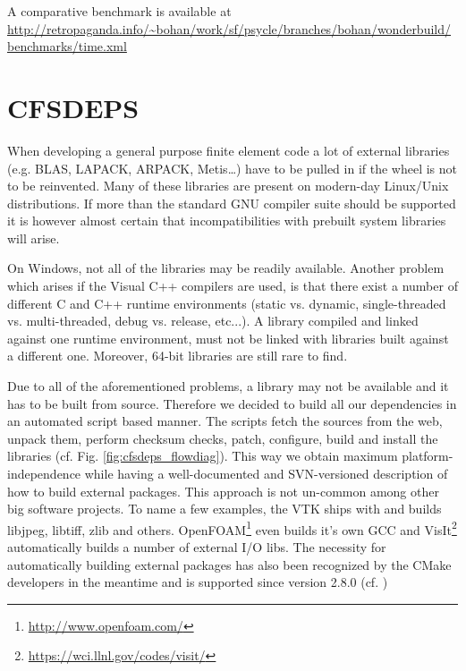 A         comparative         benchmark         is        available         at
\url{http://retropaganda.info/~bohan/work/sf/psycle/branches/bohan/wonderbuild/benchmarks/time.xml}


\section{CFSDEPS}
\label{sec:cfsdeps}

 When  developing a  general purpose  finite element  code a  lot  of external
libraries (e.g.   BLAS, LAPACK, ARPACK, Metis\ldots)  have to be  pulled in if
the wheel is not to  be reinvented.  Many  of these libraries are  present on
modern-day Linux/Unix  distributions. If more  than the standard  GNU compiler
suite should be supported it  is however almost certain that incompatibilities
with prebuilt system libraries will arise.

 On  Windows, not  all  of the  libraries  may be  readily available.  Another
problem which arises if the Visual C++ compilers are used, is that there exist
a number  of different  C and C++  runtime environments (static  vs.  dynamic,
single-threaded  vs. multi-threaded,  debug vs.  release, etc...).   A library
compiled and linked  against one runtime environment, must  not be linked with
libraries built against a different one.  Moreover, 64-bit libraries are still
rare to find.

Due to all of the aforementioned  problems, a library may not be available and
it  has to  be  built from  source.  Therefore  we  decided to  build all  our
dependencies  in an  automated script  based  manner.  The  scripts fetch  the
sources from the web, unpack  them, perform checksum checks, patch, configure,
build and install the  libraries (cf.  Fig. \ref{fig:cfsdeps_flowdiag}).  This
way we obtain maximum platform-independence while having a well-documented and
SVN-versioned description of how to  build external packages. This approach is
not un-common among  other big software projects. To name  a few examples, the
VTK  \cite{VTKWebSite}  ships  with  and  builds libjpeg,  libtiff,  zlib  and
others. OpenFOAM\footnote{\url{http://www.openfoam.com/}} even builds it's own
GCC  and VisIt\footnote{\url{https://wci.llnl.gov/codes/visit/}} automatically
builds  a  number of  external  I/O  libs.   The necessity  for  automatically
building external packages has also been recognized by the CMake developers in
the     meantime     and      is     supported     since     version     2.8.0
(cf. \cite{BuildExtPackages})

